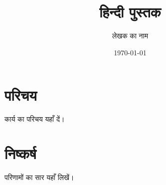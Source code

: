 \documentclass[11pt]{book}
\title{हिन्दी पुस्तक}
\author{लेखक का नाम}
\date{\today}
\begin{document}
\maketitle
\tableofcontents

\chapter{परिचय}
कार्य का परिचय यहाँ दें।

\chapter{निष्कर्ष}
परिणामों का सार यहाँ लिखें।
\end{document}
